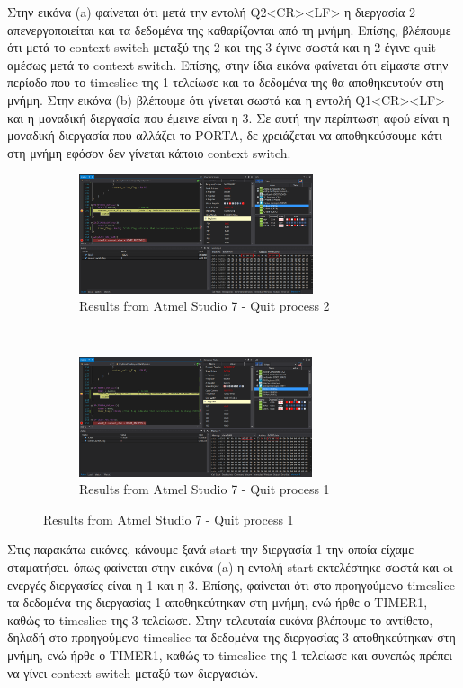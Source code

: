 \documentclass{article}
\begin{document}
	\pagebreak
	\noindent
	Στην εικόνα (a) φαίνεται ότι μετά την εντολή Q2<CR><LF> η διεργασία 2 απενεργοποιείται και τα δεδομένα της καθαρίζονται από τη μνήμη. Επίσης, βλέπουμε ότι μετά το context switch μεταξύ της 2 και της 3 έγινε σωστά και η 2 έγινε quit αμέσως μετά το context switch. Eπίσης, στην ίδια εικόνα φαίνεται ότι είμαστε στην περίοδο που το timeslice της 1 τελείωσε και τα δεδομένα της θα αποθηκευτούν στη μνήμη. Στην εικόνα (b) βλέπουμε ότι γίνεται σωστά και η εντολή Q1<CR><LF> και η μοναδική διεργασία που έμεινε είναι η 3. Σε αυτή την περίπτωση αφού είναι η μοναδική διεργασία που αλλάζει το PORTA, δε χρειάζεται να αποθηκεύσουμε κάτι στη μνήμη εφόσον δεν γίνεται κάποιο context switch.\\
	
	\begin{figure}[h!]
		\centering
		\begin{subfigure}[t]{0.5\textwidth}
			\centering
			\includegraphics[height=3.5cm,width=\linewidth]{./results/lab8_sim_q2_cs_3_1.png}
			\caption{Results from Αtmel Studio 7 - Quit process 2}
		\end{subfigure}%
		~
		\begin{subfigure}[t]{0.5\textwidth}
			\centering
			\includegraphics[height=3.5cm,width=\linewidth]{./results/lab8_sim_q1_cs_1_3.png}
			\caption{Results from Αtmel Studio 7 - Quit process 1}
		\end{subfigure}
	\end{figure}

	\noindent
	Στις παρακάτω εικόνες, κάνουμε ξανά start την διεργασία 1 την οποία είχαμε σταματήσει. όπως φαίνεται στην εικόνα (a) η εντολή start εκτελέστηκε σωστά και oι ενεργές διεργασίες είναι η 1 και η 3. Επίσης, φαίνεται ότι στο προηγούμενο timeslice τα δεδομένα της διεργασίας 1 αποθηκεύτηκαν στη μνήμη, ενώ ήρθε ο TIMER1, καθώς το timeslice της 3 τελείωσε. Στην τελευταία εικόνα βλέπουμε το αντίθετο, δηλαδή στο προηγούμενο timeslice τα δεδομένα της διεργασίας 3 αποθηκεύτηκαν στη μνήμη, ενώ ήρθε ο TIMER1, καθώς το timeslice της 1 τελείωσε και συνεπώς πρέπει να γίνει context switch μεταξύ των διεργασιών.
	
\end{document}
